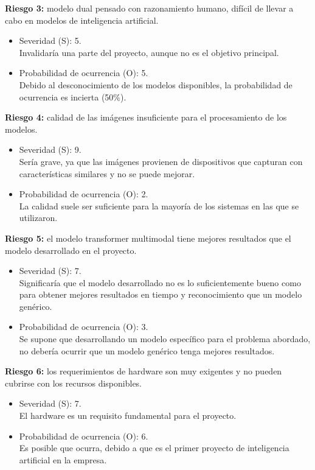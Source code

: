 \documentclass[
11pt, %
]{charter}
\begin{document}
\textbf{Riesgo 3:} modelo dual pensado con razonamiento humano, difícil de llevar a cabo en modelos de inteligencia artificial.
\begin{itemize}
	\item Severidad (S): 5.\\
	Invalidaría una parte del proyecto, aunque no es el objetivo principal.
	\item Probabilidad de ocurrencia (O): 5.\\
	Debido al desconocimiento de los modelos disponibles, la probabilidad de ocurrencia es incierta (50\%). 
\end{itemize}   

\textbf{Riesgo 4:} calidad de las imágenes insuficiente para el procesamiento de los modelos.
\begin{itemize}
	\item Severidad (S): 9.\\
	Sería grave, ya que las imágenes provienen de dispositivos que capturan con características similares y no se puede mejorar.
	\item Probabilidad de ocurrencia (O): 2.\\
	La calidad suele ser suficiente para la mayoría de los sistemas en las que se utilizaron. 
\end{itemize}   

\newpage
\textbf{Riesgo 5:} el modelo transformer multimodal tiene mejores resultados que el modelo desarrollado en el proyecto.
\begin{itemize}
	\item Severidad (S): 7. \\
	Significaría que el modelo desarrollado no es lo suficientemente bueno como para obtener mejores resultados en tiempo y reconocimiento que un modelo genérico.\\
	\item Probabilidad de ocurrencia (O): 3. \\
	Se supone que desarrollando un modelo específico para el problema abordado, no debería ocurrir que un modelo genérico tenga mejores resultados. 
\end{itemize}   

\textbf{Riesgo 6:} los requerimientos de hardware son muy exigentes y no pueden cubrirse con los recursos disponibles.
\begin{itemize}
	\item Severidad (S): 7. \\
	El hardware es un requisito fundamental para el proyecto.\\
	\item Probabilidad de ocurrencia (O): 6. \\
	Es posible que ocurra, debido a que es el primer proyecto de inteligencia artificial en la empresa. 
\end{itemize}   
\end{document}
